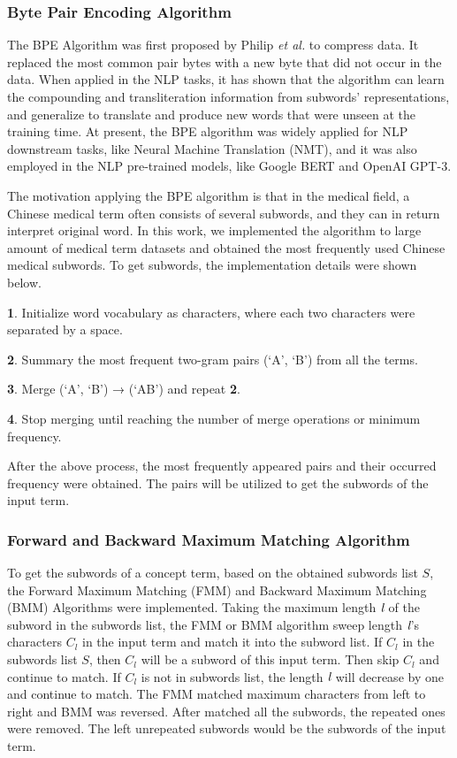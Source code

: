 \documentclass{article}
\begin{document}
\subsubsection{Byte Pair Encoding Algorithm}\label{BPE}
The BPE Algorithm was first proposed by Philip \emph{et al.} to compress data. It replaced the most common pair bytes with a new byte that did not occur in the data. When applied in the NLP tasks, it has shown that the algorithm can learn the compounding and transliteration information from subwords' representations, and generalize to translate and produce new words that were unseen at the training time. At present, the BPE algorithm was widely applied for NLP downstream tasks, like Neural Machine Translation (NMT)\cite{sennrich2015neural}, and it was also employed in the NLP pre-trained models, like Google BERT\cite{devlin2018bert} and OpenAI GPT-3\cite{brown2020language}.

The motivation applying the BPE algorithm is that in the medical field, a Chinese medical term often consists of several subwords, and they can in return interpret original word. In this work, we implemented the algorithm to large amount of medical term datasets and obtained the most frequently used Chinese medical subwords. To get subwords, the implementation details were shown below.

\textbf{1}. Initialize word vocabulary as characters, where each two characters were separated by a space. 

\textbf{2}. Summary the most frequent two-gram pairs (‘A’, ‘B’) from all the terms.

\textbf{3}. Merge (‘A’, ‘B’) → (‘AB’) and repeat \textbf{2}.

\textbf{4}. Stop merging until reaching the number of merge operations or minimum frequency.

After the above process, the most frequently appeared pairs and their occurred frequency were obtained. The pairs will be utilized to get the subwords of the input term. 

\subsubsection{Forward and Backward Maximum Matching Algorithm}\label{FMM-BMM}
To get the subwords of a concept term, based on the obtained subwords list $S$, the Forward Maximum Matching (FMM) and Backward Maximum Matching (BMM) Algorithms were implemented. Taking the maximum length $\emph{l}$ of the subword in the subwords list, the FMM or BMM algorithm sweep length $\emph{l}$'s characters $C_l$ in the input term and match it into the subword list. If $C_l$ in the subwords list $S$, then $C_l$ will be a subword of this input term. Then skip $C_l$ and continue to match. If  $C_l$ is not in subwords list, the length $\emph{l}$ will decrease by one and continue to match. The FMM matched maximum characters from left to right and BMM was reversed. After matched all the subwords, the repeated ones were removed. The left unrepeated subwords would be the subwords of the input term.
\end{document}
